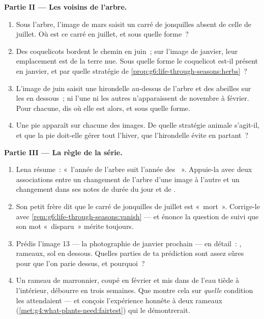 \begin{problem}
\medskip\noindent\textbf{Partie II --- Les voisins de l'arbre.}
\begin{enumerate}[resume]
  \item Sous l'arbre, l'image de mars saisit un carré de jonquilles
        absent de celle de juillet. Où est ce carré en juillet, et
        sous quelle forme~?
  \item Des coquelicots bordent le chemin en juin~; sur l'image de
        janvier, leur emplacement est de la terre nue. Sous quelle
        forme le coquelicot est-il présent en janvier, et par
        quelle stratégie de
        \cref{prop:g6:life-through-seasons:herbs}~?
  \item L'image de juin saisit une hirondelle au-dessus de l'arbre
        et des abeilles sur les  en dessous~; ni l'une ni les
        autres n'apparaissent de novembre à février. Pour chacune,
        dis où elle est alors, et sous quelle forme.
  \item Une pie apparaît sur chacune des images. De quelle
        stratégie animale s'agit-il, et que la pie doit-elle gérer
        tout l'hiver, que l'hirondelle évite en partant~?
\end{enumerate}

\medskip\noindent\textbf{Partie III --- La règle de la série.}
\begin{enumerate}[resume]
  \item Lena résume~: «~l'année de l'arbre suit l'année des
        ~». Appuie-la avec deux associations entre un
        changement de l'arbre d'une image à l'autre et un
        changement dans ses notes de durée du jour et de
        .
  \item Son petit frère dit que le carré de jonquilles de juillet
        est «~mort~». Corrige-le avec
        \cref{rem:g6:life-through-seasons:vanish} --- et énonce la
        question de suivi que son mot «~disparu~» mérite toujours.
  \item Prédis l'image 13 --- la photographie de janvier prochain
        --- en détail~: , rameaux, sol en dessous. Quelles
        parties de ta prédiction sont assez sûres pour que l'on
        parie dessus, et pourquoi~?
  \item Un rameau de marronnier, coupé en février et mis dans de
        l'eau tiède à l'intérieur, débourre en trois semaines. Que
        montre cela sur \emph{quelle} condition les 
        attendaient --- et conçois l'expérience honnête à deux rameaux
        (\cref{met:g4:what-plants-need:fairtest}) qui le
        démontrerait.
\end{enumerate}
\end{problem}
